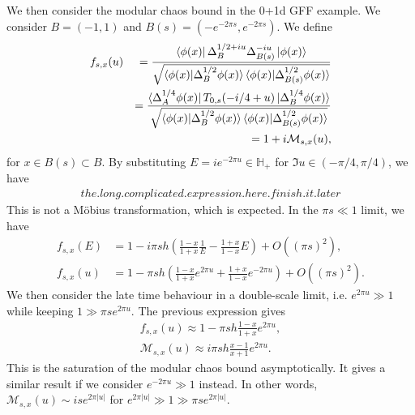 \documentclass[a4paper,11pt]{article}
\theoremstyle{definition}
\newcommand{\nn}{\nonumber}
\newcommand{\lb}{\left(}
\newcommand{\rb}{\right)}
\newcommand{\mM}{\mathcal{M}}
\begin{document}
We then consider the modular chaos bound in the 0+1d GFF example. We consider $B = (-1,1)$ and $B(s) = (-e^{-2\pi s}, e^{-2\pi s})$. We define
\begin{eqnarray}
    f_{s,x}(u)&&=\frac{\bra{\phi(x)}\Delta_B^{1/2+iu}\Delta_{B(s)}^{-iu}\ket{\phi(x)}}{\sqrt{\braket{\phi(x)|\Delta_B^{1/2}\phi(x)}\braket{\phi(x)|\Delta_{B(s)}^{1/2}\phi(x)}}}\\
    &&=\frac{\bra{\Delta_A^{1/4}\phi(x)} T_{0,s}(-i/4+u)\ket{\Delta_B^{1/4} \phi(x)}}{\sqrt{\braket{\phi(x)|\Delta_B^{1/2}\phi(x)}\braket{\phi(x)|\Delta_{B(s)}^{1/2}\phi(x)}}}\nn\\
    &&=1+i \mathcal{M}_{s,x}(u),
\end{eqnarray}
for $x \in B(s)\subset B$. By substituting $E = ie^{-2\pi u} \in {\mathbb{H}_+}$ for $\Im u \in (-\pi/4,\pi/4)$, we have
\begin{align}
    the.long.complicated.expression.here.finish.it.later
\end{align}
This is not a M\"obius transformation, which is expected. In the $\pi s \ll 1$ limit, we have
\begin{align}
    f_{s,x}(E) &= 1 - i\pi s h\lb \frac{1-x}{1+x}\frac{1}{E} - \frac{1+x}{1-x}E \rb + O((\pi s)^2),\\
    f_{s,x}(u) &= 1 - \pi s h\lb \frac{1-x}{1+x}e^{2\pi u} + \frac{1+x}{1-x}e^{-2\pi u} \rb + O((\pi s)^2).
\end{align}
We then consider the late time behaviour in a double-scale limit, i.e. $e^{2\pi u} \gg1$ while keeping $1\gg\pi se^{2\pi u}$. The previous expression gives
\begin{align} 
    f_{s,x}(u) \approx 1 - \pi s h \frac{1-x}{1+x}e^{2\pi u},\\
    \mM_{s,x}(u)\approx i\pi s h \frac{x-1}{x+1}e^{2\pi u}.
\end{align}
This is the saturation of the modular chaos bound asymptotically. It gives a similar result if we consider $e^{-2\pi u} \gg1$ instead. In other words, $\mM_{s,x}(u) \sim ise^{2\pi |u|}$ for $e^{2\pi |u|} \gg 1\gg\pi se^{2\pi |u|}$.
\end{document}
